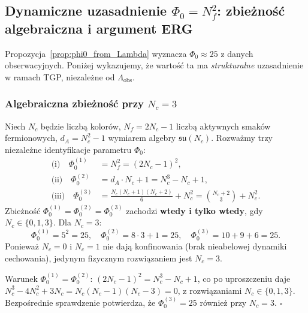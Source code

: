 \subsection{Dynamiczne uzasadnienie $\Phi_0 = N_f^2$: zbieżność
algebraiczna i argument ERG}
\label{subsec:phi0_dynamic}

Propozycja~\ref{prop:phi0_from_Lambda} wyznacza $\Phi_0 \approx 25$ z danych
obserwacyjnych. Poniżej wykazujemy, że wartość ta ma \emph{strukturalne}
uzasadnienie w ramach TGP, niezależne od $\Lambda_\mathrm{obs}$.

\subsubsection{Algebraiczna zbieżność przy $N_c = 3$}

\begin{propozycja}[Jedyność $\Phi_0 = 25$ z trzech niezależnych ścieżek]
\label{prop:phi0_convergence}
Niech $N_c$ będzie liczbą kolorów, $N_f = 2N_c - 1$ liczbą aktywnych
smaków fermionowych, $d_A = N_c^2 - 1$ wymiarem algebry $\mathfrak{su}(N_c)$.
Rozważmy trzy niezależne identyfikacje parametru $\Phi_0$:
\begin{align}
  \text{(i)}\quad \Phi_0^{(1)} &= N_f^2 = (2N_c - 1)^2, \label{eq:phi0-Nf}\\
  \text{(ii)}\quad \Phi_0^{(2)} &= d_A \cdot N_c + 1 = N_c^3 - N_c + 1,
    \label{eq:phi0-dA}\\
  \text{(iii)}\quad \Phi_0^{(3)} &= \frac{N_c(N_c+1)(N_c+2)}{6} + N_c^2
    = \binom{N_c+2}{3} + N_c^2. \label{eq:phi0-binom}
\end{align}
Zbieżność $\Phi_0^{(1)} = \Phi_0^{(2)} = \Phi_0^{(3)}$
zachodzi \textbf{wtedy i tylko wtedy}, gdy
$N_c \in \{0, 1, 3\}$. Dla $N_c = 3$:
\begin{equation}
  \Phi_0^{(1)} = 5^2 = 25, \quad
  \Phi_0^{(2)} = 8 \cdot 3 + 1 = 25, \quad
  \Phi_0^{(3)} = 10 + 9 + 6 = 25.
\end{equation}
Ponieważ $N_c = 0$ i $N_c = 1$ nie dają konfinowania
(brak nieabelowej dynamiki cechowania), jedynym fizycznym
rozwiązaniem jest $N_c = 3$.
\end{propozycja}

\begin{dowod}
Warunek $\Phi_0^{(1)} = \Phi_0^{(2)}$:
$(2N_c-1)^2 = N_c^3 - N_c + 1$, co po uproszczeniu daje
$N_c^3 - 4N_c^2 + 3N_c = N_c(N_c-1)(N_c-3) = 0$,
z rozwiązaniami $N_c \in \{0, 1, 3\}$.
Bezpośrednie sprawdzenie potwierdza, że
$\Phi_0^{(3)} = 25$ również przy $N_c = 3$.
\hfill$\square$
\end{dowod}

